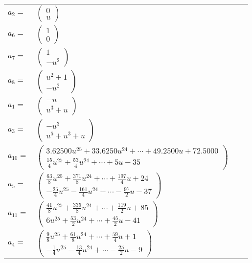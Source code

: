\documentclass[1p]{elsarticle_modified}
\theoremstyle{definition}
\begin{document}
\begin{tabular}{m{7pt} m{180pt} m{7pt} m{180pt} }
\flushright $a_{2}=$&$\begin{pmatrix}0\\u\end{pmatrix}$ \\
\flushright $a_{6}=$&$\begin{pmatrix}1\\0\end{pmatrix}$ \\
\flushright $a_{7}=$&$\begin{pmatrix}1\\- u^2\end{pmatrix}$ \\
\flushright $a_{8}=$&$\begin{pmatrix}u^2+1\\- u^2\end{pmatrix}$ \\
\flushright $a_{1}=$&$\begin{pmatrix}- u\\u^3+u\end{pmatrix}$ \\
\flushright $a_{3}=$&$\begin{pmatrix}- u^3\\u^5+u^3+u\end{pmatrix}$ \\
\flushright $a_{10}=$&$\begin{pmatrix}3.62500 u^{25}+33.6250 u^{24}+\cdots+49.2500 u+72.5000\\\frac{15}{4} u^{25}+\frac{53}{4} u^{24}+\cdots+5 u-35\end{pmatrix}$ \\
\flushright $a_{5}=$&$\begin{pmatrix}\frac{63}{8} u^{25}+\frac{371}{8} u^{24}+\cdots+\frac{197}{4} u+24\\-\frac{25}{4} u^{25}-\frac{161}{4} u^{24}+\cdots-\frac{97}{2} u-37\end{pmatrix}$ \\
\flushright $a_{11}=$&$\begin{pmatrix}\frac{41}{8} u^{25}+\frac{335}{8} u^{24}+\cdots+\frac{119}{2} u+85\\6 u^{25}+\frac{53}{2} u^{24}+\cdots+\frac{45}{2} u-41\end{pmatrix}$ \\
\flushright $a_{4}=$&$\begin{pmatrix}\frac{9}{8} u^{25}+\frac{61}{8} u^{24}+\cdots+\frac{59}{4} u+1\\-\frac{1}{4} u^{25}-\frac{13}{4} u^{24}+\cdots-\frac{25}{2} u-9\end{pmatrix}$ \\

\end{tabular}
\end{document}
